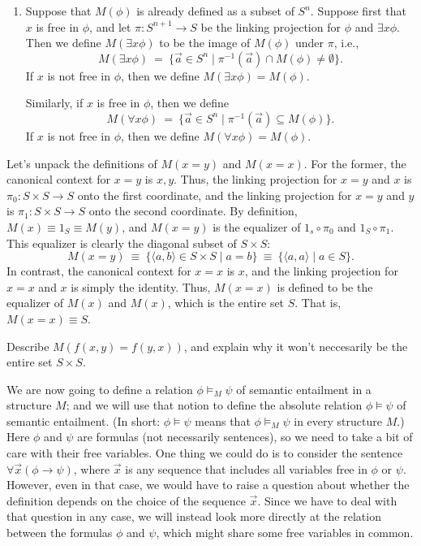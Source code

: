 \begin{defn}
\begin{enumerate}
\item Suppose that $M(\phi )$ is already defined as a subset of
  $S^n$.  Suppose first that $x$ is free in $\phi$, and let $\pi
  :S^{n+1}\to S$ be the linking projection for $\phi$ and $\exists
  x\phi$.  Then we define $M(\exists x\phi )$ to be the image of
  $M(\phi )$ under $\pi$, i.e., 
  \[ M(\exists x\phi )\: = \: \{ \vec{a}\in S^n\mid \pi
    ^{-1}(\vec{a})\cap M(\phi )\neq \emptyset \} .\] If $x$ is not
  free in $\phi$, then we define $M(\exists x\phi )=M(\phi )$.

  Similarly, if $x$ is free in $\phi$, then we define
  \[ M(\forall x\phi ) \: = \: \{ \vec{a}\in S^n \mid \pi
    ^{-1}(\vec{a})\subseteq M(\phi ) \} . \] If $x$ is not free in
  $\phi$, then we define $M(\forall x\phi )=M(\phi )$.
\end{enumerate} \end{defn}

\begin{example} Let's unpack the definitions of $M(x=y)$ and $M(x=x)$.
  For the former, the canonical context for $x=y$ is $x,y$.  Thus, the
  linking projection for $x=y$ and $x$ is $\pi _0:S\times S\to S$ onto
  the first coordinate, and the linking projection for $x=y$ and $y$
  is $\pi _1:S\times S\to S$ onto the second coordinate.  By
  definition, $M(x)\equiv 1_S\equiv M(y)$, and $M(x=y)$ is the
  equalizer of $1_s\circ \pi _0$ and $1_S\circ \pi _1$.  This
  equalizer is clearly the diagonal subset of $S\times S$:
  \[ M(x=y) \: \equiv \: \{ \langle a,b\rangle \in S\times S \mid a=b
    \} \: \equiv \: \{ \langle a,a\rangle \mid a\in S \} .\] In
  contrast, the canonical context for $x=x$ is $x$, and the linking
  projection for $x=x$ and $x$ is simply the identity.  Thus, $M(x=x)$
  is defined to be the equalizer of $M(x)$ and $M(x)$, which is the
  entire set $S$.  That is, $M(x=x)\equiv S$.
\end{example}

\begin{exercise} Describe $M(f(x,y)=f(y,x))$, and explain why it won't
  neccesarily be the entire set $S\times S$. \end{exercise}

We are now going to define a relation $\phi\vDash _M\psi$ of semantic
entailment in a structure $M$; and we will use that notion to define
the absolute relation $\phi\vDash\psi$ of semantic entailment.  (In
short: $\phi\vDash\psi$ means that $\phi \vDash _M\psi$ in every
structure $M$.)  Here $\phi$ and $\psi$ are formulas (not necessarily
sentences), so we need to take a bit of care with their free
variables.  One thing we could do is to consider the sentence
$\forall \vec{x}(\phi\to\psi )$, where $\vec{x}$ is any sequence that
includes all variables free in $\phi$ or $\psi$.  However, even in
that case, we would have to raise a question about whether the
definition depends on the choice of the sequence $\vec{x}$.  Since we
have to deal with that question in any case, we will instead look more
directly at the relation between the formulas $\phi$ and $\psi$, which
might share some free variables in common.

